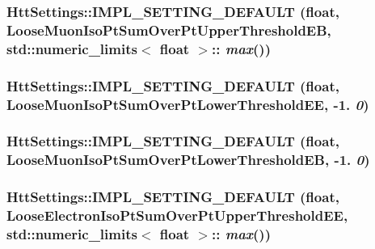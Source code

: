 \label{classHttSettings_ac15ce16c8e547817bd419f46fac8ebd9}
\hypertarget{classHttSettings_aa4be3ae364fa0015bb78ac25abbdb237}{
\subsubsection[{IMPL\_\-SETTING\_\-DEFAULT}]{\setlength{\rightskip}{0pt plus 5cm}HttSettings::IMPL\_\-SETTING\_\-DEFAULT (float, \/  LooseMuonIsoPtSumOverPtUpperThresholdEB, \/  std::numeric\_\-limits$<$ float $>$:: {\em max}())}}
\label{classHttSettings_aa4be3ae364fa0015bb78ac25abbdb237}
\hypertarget{classHttSettings_ad73987fd2167fe4486157affa5344f1b}{
\subsubsection[{IMPL\_\-SETTING\_\-DEFAULT}]{\setlength{\rightskip}{0pt plus 5cm}HttSettings::IMPL\_\-SETTING\_\-DEFAULT (float, \/  LooseMuonIsoPtSumOverPtLowerThresholdEE, \/  -\/1. {\em 0})}}
\label{classHttSettings_ad73987fd2167fe4486157affa5344f1b}
\hypertarget{classHttSettings_abb033778d9ca77b1c67a43307bf38d87}{
\subsubsection[{IMPL\_\-SETTING\_\-DEFAULT}]{\setlength{\rightskip}{0pt plus 5cm}HttSettings::IMPL\_\-SETTING\_\-DEFAULT (float, \/  LooseMuonIsoPtSumOverPtLowerThresholdEB, \/  -\/1. {\em 0})}}
\label{classHttSettings_abb033778d9ca77b1c67a43307bf38d87}
\hypertarget{classHttSettings_a42aed7904ac15ac2617099a17299ec33}{
\subsubsection[{IMPL\_\-SETTING\_\-DEFAULT}]{\setlength{\rightskip}{0pt plus 5cm}HttSettings::IMPL\_\-SETTING\_\-DEFAULT (float, \/  LooseElectronIsoPtSumOverPtUpperThresholdEE, \/  std::numeric\_\-limits$<$ float $>$:: {\em max}())}}
